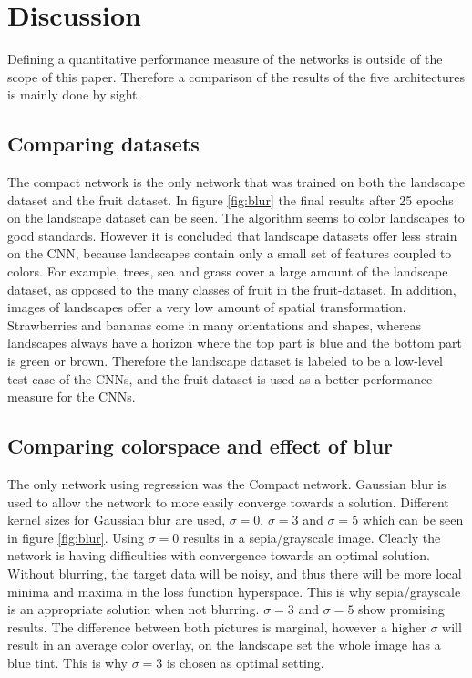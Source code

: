 \section{Discussion}

Defining a quantitative performance measure of the networks is outside of the scope of this paper. Therefore a comparison of the results of the five architectures is mainly done by sight.

\subsection{Comparing datasets}
The compact network is the only network that was trained on both the landscape dataset and the fruit dataset. In figure \ref{fig:blur} the final results after 25 epochs on the landscape dataset can be seen. The algorithm seems to color landscapes to good standards. However it is concluded that landscape datasets offer less strain on the CNN, because landscapes contain only a small set of features coupled to colors. For example, trees, sea and grass cover a large amount of the landscape dataset, as opposed to the many classes of fruit in the fruit-dataset. In addition, images of landscapes offer a very low amount of spatial transformation. Strawberries and bananas come in many orientations and shapes, whereas landscapes always have a horizon where the top part is blue and the bottom part is green or brown. Therefore the landscape dataset is labeled to be a low-level test-case of the CNNs, and the fruit-dataset is used as a better performance measure for the CNNs.

\subsection{Comparing colorspace and effect of blur}
The only network using regression was the Compact network. Gaussian blur is used to allow the network to more easily converge towards a solution. Different kernel sizes for Gaussian blur are used, $\sigma = 0$, $\sigma = 3$ and $\sigma = 5$ which can be seen in figure \ref{fig:blur}. Using $\sigma = 0 $ results in a sepia/grayscale image. 
Clearly the network is having difficulties with convergence towards an optimal solution. Without blurring, the target data will be noisy, and thus there will be more local minima and maxima in the loss function hyperspace. This is why sepia/grayscale is an appropriate solution when not blurring. $\sigma = 3$ and $\sigma = 5$ show promising results. The difference between both pictures is marginal, however a higher $\sigma$ will result in an average color overlay, on the landscape set the whole image has a blue tint. This is why $\sigma = 3$ is chosen as optimal setting.


